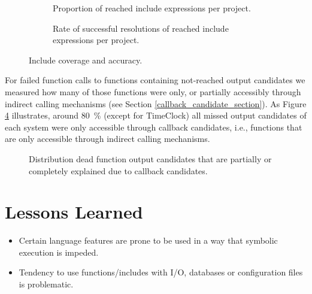 \documentclass[preprint]{sig-alternate-05-2015}
\begin{document}
\begin{figure}[t!]
    \centering
    \begin{subfigure}[t]{0.5 \textwidth}    	
        \centering        
				
        \caption{Proportion of reached include expressions per project.}
        \label{include_coverage_results1}
    \end{subfigure}%
	\hfill
    \begin{subfigure}[t]{0.5\textwidth}    
        \centering
                
        \caption{Rate of successful resolutions of reached include expressions
        per project.}
        \label{include_coverage_results2}
    \end{subfigure}
    \label{include_coverage_results}
    \caption{Include coverage and accuracy.}
\end{figure}


For failed function calls to functions containing not-reached output candidates we measured how many of those functions were only, or partially accessibly through indirect calling mechanisms (see Section \ref{callback_candidate_section}). As Figure \ref{output_candidate_explanation} illustrates, around 80~\% (except for TimeClock) all missed output candidates of each system were only accessible through callback candidates, i.e., functions that are only accessible through indirect calling mechanisms.

\begin{figure}
	
	\caption{Distribution dead function output candidates that are partially or
	completely explained due to callback candidates.}
	\label{output_candidate_explanation}
\end{figure}

\section{Lessons Learned}
\begin{itemize}
  \item Certain language features are prone to be used in a way that symbolic
  execution is impeded.
  \item Tendency to use functions/includes with I/O, databases or configuration
  files is problematic.
\end{itemize}
\end{document}
